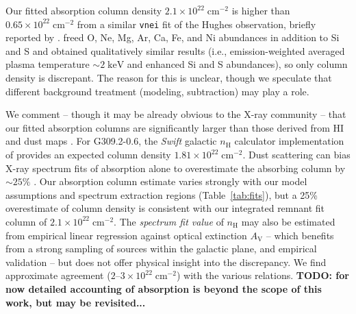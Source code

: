 \documentclass[preprint2,tighten,trackchanges]{aastex6}
\newcommand*{\mt}{\mathrm}
\newcommand*{\unit}[1]{\;\mt{#1}}  %
\newcommand*{\abt}{\mathord{\sim}} %
\newcommand*{\nH}{n_{\mathrm{H}}}
\newcommand*{\nHunits}{\times 10^{22} \unit{cm^{-2}}}
\newcommand*{\AV}{A_{\mathrm{V}}}
\begin{document}
\begin{figure*}[]
    \label{fig:spec-src}  %
\end{figure*}

Our fitted absorption column density $2.1 \times 10^{22} \unit{cm^{-2}}$ is
higher than $0.65 \times 10^{22} \unit{cm^{-2}}$ from a similar \texttt{vnei}
fit of the Hughes observation, briefly reported by \citet{safi-harb2007}.
\citet{safi-harb2007} freed O, Ne, Mg, Ar, Ca, Fe, and Ni abundances in
addition to Si and S and obtained qualitatively similar results (i.e.,
emission-weighted averaged plasma temperature $\abt 2 \unit{keV}$ and enhanced
Si and S abundances), so only column density is discrepant.
The reason for this is unclear, though we speculate that different background
treatment (modeling, subtraction) may play a role.

We comment -- though it may be already obvious to the X-ray community -- that
our fitted absorption columns are significantly larger than those derived from
HI and dust maps \citep[e.g.,][]{willingale2013}.
For G309.2-0.6, the \textit{Swift} galactic $\nH$ calculator implementation of
\citet{willingale2013} provides an expected column density $1.81 \nHunits$.
Dust scattering can bias X-ray spectrum fits of absorption alone to
overestimate the absorbing column by $\abt25\%$ \citep{corrales2016}.
Our absorption column estimate varies strongly with our model assumptions and
spectrum extraction regions (Table~\ref{tab:fits}), but a 25\% overestimate of
column density is consistent with our integrated remnant fit column of $2.1
\nHunits$.
The \textit{spectrum fit value} of $\nH$ may also be estimated from empirical
linear regression against optical extinction $\AV$ \citep[e.g.,][]{foight2015}
-- which benefits from a strong sampling of sources within the galactic plane,
and empirical validation -- but does not offer physical insight into the
discrepancy. We find approximate agreement ($2$--$3 \nHunits$) with the various
relations.
\textbf{TODO: for now detailed accounting of absorption is beyond the scope of
this work, but may be revisited...}
\end{document}
